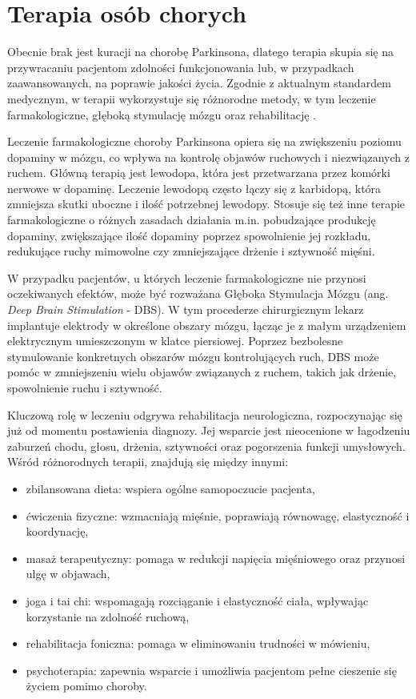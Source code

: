 
\section{Terapia osób chorych}
\label{sec:terapia}
Obecnie brak jest kuracji na chorobę Parkinsona, dlatego terapia skupia się na przywracaniu pacjentom zdolności funkcjonowania
lub, w przypadkach zaawansowanych, na poprawie jakości życia.
Zgodnie z aktualnym standardem medycznym, w terapii wykorzystuje się różnorodne metody, w tym leczenie farmakologiczne, głęboką stymulację mózgu oraz rehabilitację \cite{National_Institute_on_Aging_2022}.

Leczenie farmakologiczne choroby Parkinsona opiera się na zwiększeniu poziomu dopaminy w mózgu, co wpływa na kontrolę objawów
ruchowych i niezwiązanych z ruchem. Główną terapią jest lewodopa, która jest przetwarzana przez komórki nerwowe w dopaminę.
Leczenie lewodopą często łączy się z karbidopą, która zmniejsza skutki uboczne i ilość potrzebnej lewodopy.
Stosuje się też inne terapie farmakologiczne o różnych zasadach działania m.in. pobudzające produkcję dopaminy,
zwiększające ilość dopaminy poprzez spowolnienie jej rozkładu, redukujące ruchy mimowolne czy zmniejszające drżenie i sztywność mięśni.

W przypadku pacjentów, u których leczenie farmakologiczne nie przynosi oczekiwanych efektów, może być rozważana Głęboka Stymulacja Mózgu (ang. \emph{Deep Brain Stimulation} - DBS).
W tym procederze chirurgicznym lekarz implantuje elektrody w określone obszary mózgu, łącząc je z małym urządzeniem elektrycznym umieszczonym w klatce piersiowej.
Poprzez bezbolesne stymulowanie konkretnych obszarów mózgu kontrolujących ruch, DBS może pomóc w zmniejszeniu wielu objawów związanych z ruchem,
takich jak drżenie, spowolnienie ruchu i sztywność.

Kluczową rolę w leczeniu odgrywa rehabilitacja neurologiczna, rozpoczynając się już od momentu postawienia diagnozy.
Jej wsparcie jest nieocenione w łagodzeniu zaburzeń chodu, głosu, drżenia, sztywności oraz pogorszenia funkcji umysłowych.
Wśród różnorodnych terapii, znajdują się między innymi:
\begin{itemize}[itemsep=0.1pt]
	\item zbilansowana dieta: wspiera ogólne samopoczucie pacjenta,
	\item ćwiczenia fizyczne: wzmacniają mięśnie, poprawiają równowagę, elastyczność i koordynację,
	\item masaż terapeutyczny: pomaga w redukcji napięcia mięśniowego oraz przynosi ulgę w objawach,
	\item joga i tai chi: wspomagają rozciąganie i elastyczność ciała, wpływając korzystanie na zdolność ruchową,
	\item rehabilitacja foniczna: pomaga w eliminowaniu trudności w mówieniu,
	\item psychoterapia: zapewnia wsparcie i umożliwia pacjentom pełne cieszenie się życiem pomimo choroby.
\end{itemize}


